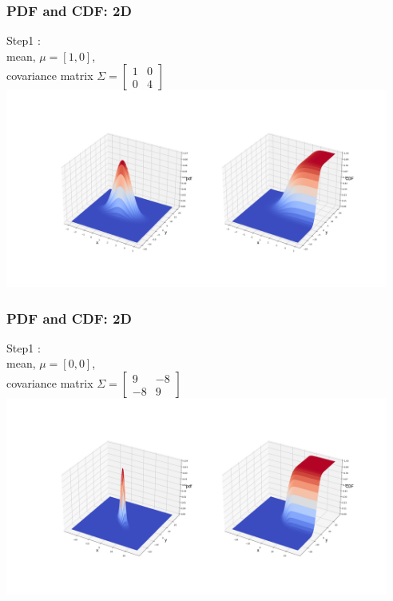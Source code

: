 \documentclass{beamer}
\begin{document}
\begin{frame}
\frametitle{PDF and CDF: 2D}
Step1 :
\\mean, $\mu = [1,0]$,\\
covariance matrix $\Sigma = \begin{bmatrix}
    1 & 0 \\
    0&4
\end{bmatrix}$\newline\\
\includegraphics[height=6.5cm]{2D-2.png}
\end{frame}

\begin{frame}
\frametitle{PDF and CDF: 2D}
Step1 :
\\mean, $\mu = [0,0]$,\\
covariance matrix $\Sigma = \begin{bmatrix}
    9 & -8\\
    -8&9
\end{bmatrix}$\newline\\
\includegraphics[height=6.5cm]{2D-3.png}
\end{frame}
\end{document}

